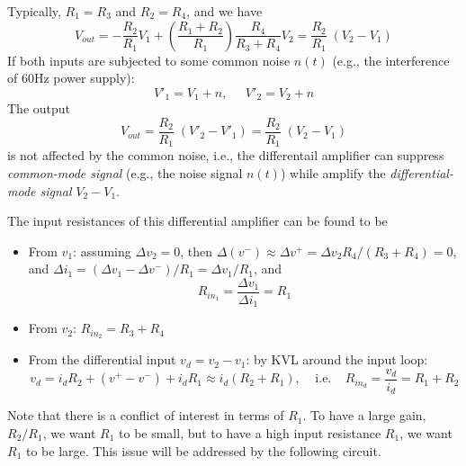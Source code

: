 \documentclass{article}
\begin{document}
\begin{itemize}
  Typically, $R_1=R_3$ and $R_2=R_4$, and we have
  \begin{equation}
    V_{out}=-\frac{R_2}{R_1}V_1+\left(\frac{R_1+R_2}{R_1}\right)\frac{R_4}{R_3+R_4}V_2 
    =\frac{R_2}{R_1}\;(V_2-V_1)	
  \end{equation}
  If both inputs are subjected to some common noise $n(t)$ (e.g., the 
  interference of 60Hz power supply):
  \begin{equation}
    V'_1=V_1+n, \;\;\;\;\;V'_2=V_2+n
  \end{equation}
  The output
  \begin{equation}
    V_{out}=\frac{R_2}{R_1}\;(V'_2-V'_1)=\frac{R_2}{R_1}\;(V_2-V_1) 
  \end{equation}
  is not affected by the common noise, i.e., the differentail amplifier
  can suppress {\em common-mode signal} (e.g., the noise signal $n(t)$)
  while amplify the {\em differential-mode signal} $V_2-V_1$.

  The input resistances of this differential amplifier can be found to be
  \begin{itemize}
  \item From $v_1$: assuming $\Delta v_2=0$, then 
    $\Delta(v^-)\approx \Delta v^+=\Delta v_2 R_4/(R_3+R_4)=0$, and
    $\Delta i_1=(\Delta v_1-\Delta v^-)/R_1=\Delta v_1/R_1$, and
    \begin{equation}
      R_{in_1}=\frac{\Delta v_1}{\Delta i_1}=R_1
    \end{equation}
  \item From $v_2$: $R_{in_2}=R_3+R_4$
  \item From the differential input $v_d=v_2-v_1$: by KVL around the input
    loop:
    \begin{equation}
      v_d=i_dR_2+(v^+-v^-)+i_dR_1\approx i_d(R_2+R_1),
      \;\;\;\;\mbox{i.e.}\;\;\;\;
      R_{in_d}=\frac{v_d}{i_d}=R_1+R_2
    \end{equation}
  \end{itemize}

  Note that there is a conflict of interest in terms of $R_1$. To have a 
  large gain, $R_2/R_1$, we want $R_1$ to be small, but to have a high 
  input resistance $R_1$, we want $R_1$ to be large. This issue will be
  addressed by the following circuit.


\end{itemize}
\end{document}
